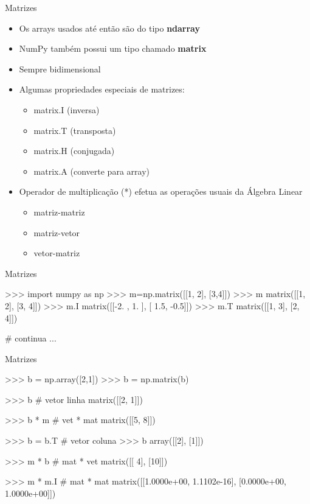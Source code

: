 \documentclass[12pt,t,graphics]{beamer}
\begin{document}
\begin{frame}[t,fragile]{Matrizes}
	\begin{itemize}
		\item Os arrays usados até então são do tipo \textbf{ndarray}
		\item NumPy também possui um tipo chamado \textbf{matrix}
		\item Sempre bidimensional
		\item Algumas propriedades especiais de matrizes:
		\begin{itemize}
			\item matrix.I (inversa)
			\item matrix.T (transposta)
			\item matrix.H (conjugada)
			\item matrix.A (converte para array)
		\end{itemize}
		\item Operador de multiplicação (*) efetua as operações usuais
		da Álgebra Linear
		\begin{itemize}
			\item matriz-matriz
			\item matriz-vetor
			\item vetor-matriz
		\end{itemize}
	\end{itemize}
\end{frame}

\begin{frame}[t,fragile]{Matrizes}
	\vspace{-0.25cm}
		\begin{python}
>>> import numpy as np
>>> m=np.matrix([[1, 2], [3,4]])
>>> m
matrix([[1, 2],
        [3, 4]])
>>> m.I
matrix([[-2. ,  1. ],
        [ 1.5, -0.5]])
>>> m.T
matrix([[1, 3],
        [2, 4]])
       
# continua ...             
		\end{python}
\end{frame}

\begin{frame}[t,fragile]{Matrizes}
	\vspace{-0.25cm}
	\begin{python}	
>>> b = np.array([2,1])
>>> b = np.matrix(b)

>>> b             # vetor linha
matrix([[2, 1]])  

>>> b * m         # vet * mat
matrix([[5, 8]])

>>> b = b.T       # vetor coluna
>>> b
array([[2],
       [1]])
       
>>> m * b         # mat * vet
matrix([[ 4],
        [10]])
        
>>> m * m.I       # mat * mat
matrix([[1.0000e+00, 1.1102e-16],
        [0.0000e+00, 1.0000e+00]])
	\end{python}
\end{frame}
\end{document}
